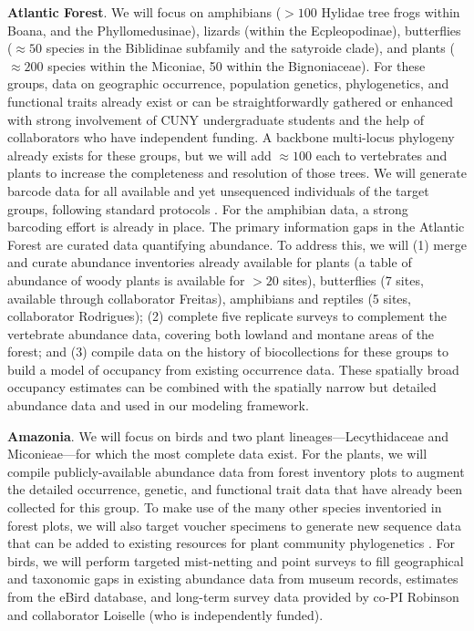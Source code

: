 \documentclass[11pt]{article}
\begin{document}
\textbf{Atlantic Forest}. We will focus on amphibians ($> 100$ Hylidae
tree frogs within Boana, and the Phyllomedusinae), lizards (within the
Ecpleopodinae), butterflies ($\approx 50$ species in the Biblidinae
subfamily and the satyroide clade), and plants ($\approx 200$ species
within the Miconiae, 50 within the Bignoniaceae). For these groups,
data on geographic occurrence, population genetics, phylogenetics, and
functional traits already exist or can be straightforwardly gathered
or enhanced with strong involvement of CUNY undergraduate students and
the help of collaborators who have independent funding. A backbone
multi-locus phylogeny already exists for these groups, but we will add
$\approx 100$ each to vertebrates and plants to increase the
completeness and resolution of those trees. We will generate barcode
data for all available and yet unsequenced individuals of the target
groups, following standard protocols \cite{che2012,
  Krehenwinkel2017-zk, bi2018chloroplast}. For the amphibian data, a
strong barcoding effort is already in place.  The primary information
gaps in the Atlantic Forest are curated data quantifying abundance. To
address this, we will (1) merge and curate abundance inventories
already available for plants (a table of abundance of woody plants is
available for $> 20$ sites), butterflies (7 sites, available through
collaborator Freitas), amphibians and reptiles (5 sites, collaborator
Rodrigues); (2) complete five replicate surveys to complement the
vertebrate abundance data, covering both lowland and montane areas of
the forest; and (3) compile data on the history of biocollections for
these groups to build a model of occupancy from existing occurrence
data. These spatially broad occupancy estimates can be combined with
the spatially narrow but detailed abundance data and used in our
modeling framework.

\textbf{Amazonia}. We will focus on birds and two plant
lineages---Lecythidaceae and Miconieae---for which the most complete
data exist. For the plants, we will compile publicly-available
abundance data from forest inventory plots
\cite{Lopez-Gonzalez2011-wr, Ter_Steege2011-yr, Rainfor2018-so} to
augment the detailed occurrence, genetic, and functional trait data
that have already been collected for this group. To make use of the
many other species inventoried in forest plots, we will also target
voucher specimens to generate new sequence data that can be added to
existing resources for plant community phylogenetics
\cite{webb2008phylocom, Harmon2013-wb}.  For birds, we will perform
targeted mist-netting and point surveys to fill geographical and
taxonomic gaps in existing abundance data from museum records,
estimates from the eBird database, and long-term survey data provided
by co-PI Robinson and collaborator Loiselle (who is independently funded).
\end{document}

